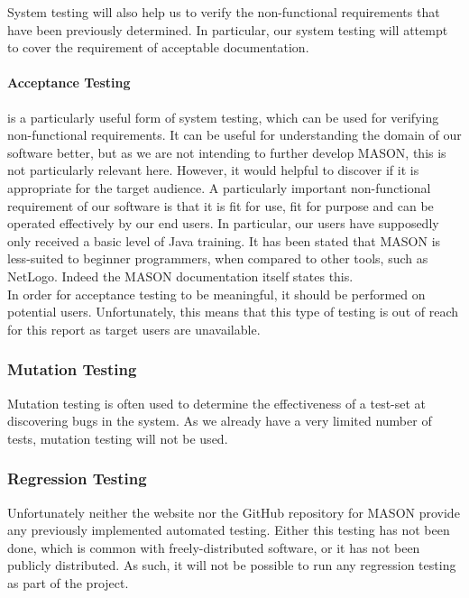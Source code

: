 \documentclass[11pt]{article}
\begin{document}
System testing will also help us to verify the non-functional requirements that have been previously determined.
In particular, our system testing will attempt to cover the requirement of acceptable documentation.

\paragraph{Acceptance Testing}
is a particularly useful form of system testing, which can be used for verifying non-functional requirements.
It can be useful for understanding the domain of our software better, but as we are not intending to further develop MASON, this is not particularly relevant here.
However, it would helpful to discover if it is appropriate for the target audience.
A particularly important non-functional requirement of our software is that it is fit for use, fit for purpose and can be operated effectively by our end users.
In particular, our users have supposedly only received a basic level of Java training.
It has been stated that MASON is less-suited to beginner programmers, when compared to other tools, such as NetLogo\cite{abm_platforms_review}.
Indeed the MASON documentation itself states this\cite[pp.8]{mason_doc}.
\\

In order for acceptance testing to be meaningful, it should be performed on potential users.
Unfortunately, this means that this type of testing is out of reach for this report as target users are unavailable.

\subsubsection{Mutation Testing}
Mutation testing is often used to determine the effectiveness of a test-set at discovering bugs in the system.
As we already have a very limited number of tests, mutation testing will not be used.

\subsubsection{Regression Testing}
Unfortunately neither the website nor the GitHub repository for MASON provide any previously implemented automated testing.
Either this testing has not been done, which is common with freely-distributed software, or it has not been publicly distributed.
As such, it will not be possible to run any regression testing as part of the project.
\end{document}
